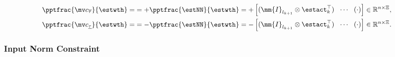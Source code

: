 \documentclass[letterpaper, journal]{IEEEtran}
\begin{document}
\begin{equation}
    \begin{aligned}
        \pptfrac{\mv c_{\overline \tau}}{\estwth}
        =& 
        = 
            +\pptfrac{\estNN}{\estwth}
        =
        +
        \begin{bmatrix}
            (\mm{I}_{l_{k+1}}\otimes \estact_{k}^\top)&
            \!\cdots\! &
            (
                \cdot
            )
        \end{bmatrix} 
        \in
        \mathbb R^{n\times \Xi}
        , 
        \\
        \pptfrac{\mv c_{\underline\tau}}{\estwth}         
        =
        & 
        = 
        -\pptfrac{\estNN}{\estwth}
        =
        -\begin{bmatrix}
            (\mm{I}_{l_{k+1}}\otimes \estact_{k}^\top)&
            \!\cdots\! &
            (
                \cdot
            )
        \end{bmatrix} 
        \in
        \mathbb R^{n\times \Xi}
        .
    \end{aligned}
    \label{eq:cstr:input:bound:grad}
\end{equation}

\subsubsection{Input Norm Constraint}\label{sec:appen:cstr:input:norm}
\end{document}

